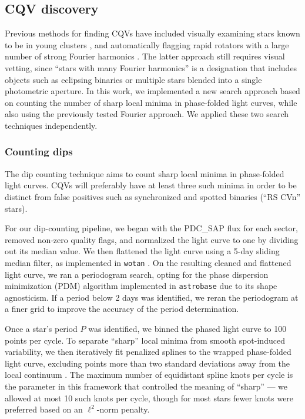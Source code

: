 \documentclass[11pt,twocolumn,tighten]{aastex63}
\begin{document}
\subsection{CQV discovery}
\label{subsec:discoverymethods}

Previous methods for finding CQVs have included visually
examining stars known to be in young clusters
\citep{2016AJ....152..114R,2017AJ....153..152S}, and automatically
flagging rapid rotators with a large number of strong Fourier
harmonics \citep{2019ApJ...876..127Z}.  The latter approach still requires
visual vetting, since ``stars with many Fourier harmonics''
is a designation that
includes objects such as eclipsing binaries or multiple stars
blended into a single photometric aperture.  In this work, we
implemented a new search approach based on counting the number of
sharp local minima in phase-folded light curves, while also using the
previously tested Fourier approach.  We applied these two search
techniques independently.   


\subsubsection{Counting dips}
\label{subsec:counting}

The dip counting technique aims to count sharp local minima in
phase-folded light curves.  CQVs will preferably have at least three
such minima in order to be distinct from false positives such as
synchronized and spotted binaries (``RS CVn'' stars). 

For our dip-counting pipeline, we began with the PDC\_SAP flux for
each sector, removed non-zero quality flags, and normalized the light
curve to one by dividing out its median value.  We then flattened the
light curve using a 5-day sliding median filter, as implemented in
\texttt{wotan} \citep{2019AJ....158..143H}.  On the resulting cleaned
and flattened light curve, we ran a periodogram search, opting for the
\citet{1978ApJ...224..953S} phase dispersion minimization (PDM)
algorithm implemented in \texttt{astrobase}
\citep{2021zndo...1011188B} due to its shape agnosticism.  If a period
below 2 days was identified, we reran the periodogram at a finer grid
to improve the accuracy of the period determination.

Once a star's period $P$ was identified, we binned the phased light
curve to 100 points per cycle.  To separate ``sharp'' local minima
from smooth spot-induced variability, we then iteratively fit
penalized splines to the wrapped phase-folded light curve, excluding
points more than two standard deviations away from the local continuum
\citep{2019AJ....158..143H}.  The maximum number of equidistant spline
knots per cycle is the parameter in this framework that controlled the
meaning of ``sharp'' --- we allowed at most 10 such knots per cycle,
though for most stars fewer knots were preferred based on an
$\ell^2$-norm penalty. 
\end{document}
